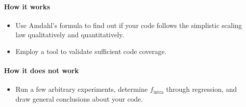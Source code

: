 \paragraph*{How it works}

\begin{itemize}[noitemsep]
  \item[$\boxplus$] Use Amdahl's formula to find out if your code follows the simplistic scaling law qualitatively and quantitatively.
  \item[$\boxplus$] Employ a tool to validate sufficient code coverage.
\end{itemize}


\paragraph*{How it does not work}

\begin{itemize}[noitemsep]
  \item[$\boxminus$] Run a few arbitrary experiments, determine $f_{\text{intra}}$ through regression, and draw general conclusions about your code.
\end{itemize}

